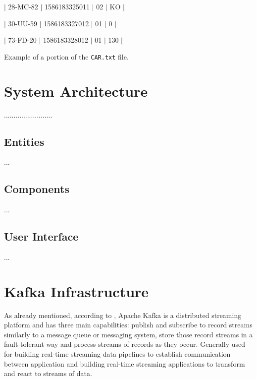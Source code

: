 \documentclass[12pt]{article}
\begin{document}
$|$ 28-MC-82 $|$ 1586183325011 $|$ 02 $|$ KO $|$

$|$ 30-UU-59 $|$ 1586183327012 $|$ 01 $|$ 0 $|$

$|$ 73-FD-20 $|$ 1586183328012 $|$ 01 $|$ 130 $|$

Example of a portion of the \texttt{CAR.txt} file.

\newpage 
\section{System Architecture} %

.........................

\subsection{Entities} %

...

\subsection{Components} %

...

\subsection{User Interface} %

...

\newpage
\section{Kafka Infrastructure} %
As already mentioned, according to \cite{kafka}, Apache Kafka is a distributed streaming platform and has three main capabilities: publish and subscribe to record streams similarly to a message queue or messaging system, store those record streams in a fault-tolerant way and process streams of records as they occur. Generally used for building real-time streaming data pipelines to establish communication between application and building real-time streaming applications to transform and react to streams of data.
\end{document}
